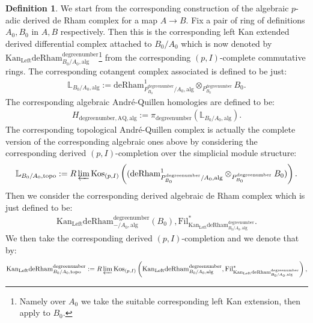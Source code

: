 \documentclass[11pt]{book}
\theoremstyle{definition}
\newtheorem{definition}[theorem]{Definition}
\numberwithin{equation}{section}
\begin{document}
\begin{definition}
We start from the corresponding construction of the algebraic $p$-adic derived de Rham complex for a map $A\rightarrow B$. Fix a pair of ring of definitions $A_0,B_0$ in $A,B$ respectively. Then this is the corresponding left Kan extended derived differential complex attached to $B_0/A_0$ which is now denoted by $\mathrm{Kan}_\mathrm{Left}\mathrm{deRham}^\text{degreenumber}_{{B_0}/A_0,\mathrm{alg}}$\footnote{Namely over $A_0$ we take the suitable corresponding left Kan extension, then apply to $B_0$.} from the corresponding $(p,I)$-complete commutative rings. The corresponding cotangent complex associated is defined to be just:
\begin{align}
\mathbb{L}_{B_0/A_0,\mathrm{alg}}:=	\mathrm{deRham}^1_{P^\text{degreenumber}_{B_0}/A_0,\mathrm{alg}}\otimes_{P^\text{degreenumber}_{B_0}} B_0.
\end{align}
The corresponding algebraic Andr\'e-Quillen homologies are defined to be:
\begin{align}
H_{\text{degreenumber},{\mathrm{AQ}},\mathrm{alg}}:=\pi_\text{degreenumber} (\mathbb{L}_{B_0/A_0,\mathrm{alg}}). 	
\end{align}
The corresponding topological Andr\'e-Quillen complex is actually the complete version of the corresponding algebraic ones above by considering the corresponding derived $(p,I)$-completion over the simplicial module structure:
\begin{align}
\mathbb{L}_{B_0/A_0,\mathrm{topo}}:=R\varprojlim \mathrm{Kos}_{(p,I)}	\left((\mathrm{deRham}^1_{P^\text{degreenumber}_{B_0}/A_0,\mathrm{alg}}\otimes_{P^\text{degreenumber}_{B_0}} B_0)\right).
\end{align}
Then we consider the corresponding derived algebraic de Rham complex which is just defined to be:
\begin{align}
\mathrm{Kan}_\mathrm{Left}\mathrm{deRham}^\text{degreenumber}_{-/A_0,\mathrm{alg}}(B_0),\mathrm{Fil}^*_{\mathrm{Kan}_\mathrm{Left}\mathrm{deRham}^\text{degreenumber}_{B_0/A_0,\mathrm{alg}}}.	
\end{align}
We then take the corresponding derived $(p,I)$-completion and we denote that by:
\begin{align}
\mathrm{Kan}_\mathrm{Left}\mathrm{deRham}^\text{degreenumber}_{B_0/A_0,\mathrm{topo}}:=R\varprojlim \mathrm{Kos}_{(p,I)}\left(\mathrm{Kan}_\mathrm{Left}\mathrm{deRham}^\text{degreenumber}_{B_0/A_0,\mathrm{alg}},\mathrm{Fil}^*_{\mathrm{Kan}_\mathrm{Left}\mathrm{deRham}^\text{degreenumber}_{B_0/A_0,\mathrm{alg}}}\right),\\

\end{align}
\end{definition}
\end{document}
